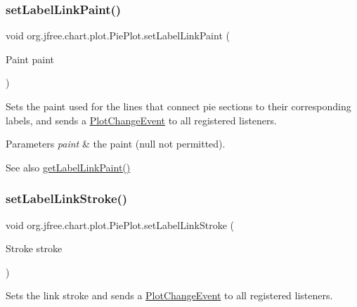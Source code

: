 \subsubsection{\texorpdfstring{set\+Label\+Link\+Paint()}{setLabelLinkPaint()}}
{\footnotesize\ttfamily void org.\+jfree.\+chart.\+plot.\+Pie\+Plot.\+set\+Label\+Link\+Paint (\begin{DoxyParamCaption}\item[{Paint}]{paint }\end{DoxyParamCaption})}

Sets the paint used for the lines that connect pie sections to their corresponding labels, and sends a \mbox{\hyperlink{}{Plot\+Change\+Event}} to all registered listeners.


\begin{DoxyParams}{Parameters}
{\em paint} & the paint ({\ttfamily null} not permitted).\\
\hline
\end{DoxyParams}
\begin{DoxySeeAlso}{See also}
\mbox{\hyperlink{classorg_1_1jfree_1_1chart_1_1plot_1_1_pie_plot_a353bf3cd5156533feab1e40e58a6f64a}{get\+Label\+Link\+Paint()}} 
\end{DoxySeeAlso}
\mbox{\label{classorg_1_1jfree_1_1chart_1_1plot_1_1_pie_plot_a763d73175ed86a367237e992dbd3dde6}} 
\subsubsection{\texorpdfstring{set\+Label\+Link\+Stroke()}{setLabelLinkStroke()}}
{\footnotesize\ttfamily void org.\+jfree.\+chart.\+plot.\+Pie\+Plot.\+set\+Label\+Link\+Stroke (\begin{DoxyParamCaption}\item[{Stroke}]{stroke }\end{DoxyParamCaption})}

Sets the link stroke and sends a \mbox{\hyperlink{}{Plot\+Change\+Event}} to all registered listeners.


